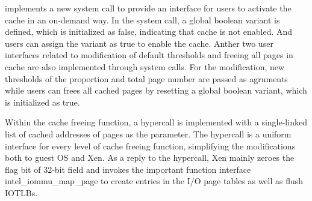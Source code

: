 \name implements a new system call to provide an interface for users to activate the cache in an on-demand way. In the system call, a global boolean variant is defined, which is initialized as false, indicating that cache is not enabled. And users can assign the variant as true to enable the cache. Anther two user interfaces related to modification of default thresholds and freeing all pages in cache are also implemented through system calls. For the modification, new thresholds of the proportion and total page number are passed as agruments while users can frees all cached pages by resetting a global boolean variant, which is initialized as true.

Within the cache freeing function, a hypercall is implemented with a single-linked list of cached addresses of pages as the parameter. The hypercall is a uniform interface for every level of cache freeing function, simplifying the modifications both to guest OS and Xen. As a reply to the hypercall, Xen mainly zeroes the flag bit of 32-bit field and invokes the important function interface intel\_iommu\_map\_page to create entries in the I/O page tables as well as flush IOTLBs.

